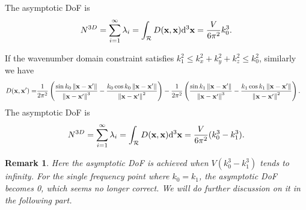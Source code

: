 \documentclass[12pt,draftclsnofoot,journal,onecolumn]{IEEEtran}
\newtheorem{remark}{Remark}
\begin{document}
	The asymptotic DoF is 
	\begin{equation}
		\begin{aligned}
			N^{3D} = \sum_{i=1}^\infty \lambda_i = \int_{\mathcal{R}}D({\bf x},{\bf x}){\rm d}^3{\bf x} = \frac{V}{6\pi^2}k_0^3.
		\end{aligned}
	\end{equation}
	
	If the wavenumber domain constraint satisfies $k_1^2\leqslant k_x^2+k_y^2+k_z^2 \leqslant k_0^2$, similarly we have
	\begin{equation}
		\begin{aligned}
			D({\bf x},{\bf x}') =& \frac{1}{2\pi^2} \left( \frac{\sin k_0\left\| {\bf x}-{\bf x}' \right\|}{\left\| {\bf x}-{\bf x}' \right\|^3}-\frac{k_0\cos k_0\left\| {\bf x}-{\bf x}' \right\|}{\left\| {\bf x}-{\bf x}' \right\|^2} \right)
	-\frac{1}{2\pi^2} \left( \frac{\sin k_1\left\| {\bf x}-{\bf x}' \right\|}{\left\| {\bf x}-{\bf x}' \right\|^3}-\frac{k_1\cos k_1\left\| {\bf x}-{\bf x}' \right\|}{\left\| {\bf x}-{\bf x}' \right\|^2} \right).
		\end{aligned}
		\label{equ_spherical_shell}
	\end{equation}
	The asymptotic DoF is 
	\begin{equation}
	\begin{aligned}
		N^{3D} = \sum_{i=1}^\infty \lambda_i = \int_{\mathcal{R}}D({\bf x},{\bf x}){\rm d}^3{\bf x} = \frac{V}{6\pi^2}(k_0^3-k_1^3).
	\end{aligned}
	\end{equation}
	\begin{remark}
		Here the asymptotic DoF is achieved when $V(k_0^3-k_1^3)$ tends to infinity. For the single frequency point where $k_0=k_1$, the asymptotic DoF becomes 0, which seems no longer correct. We will do further discussion on it in the following part. 
		\end{remark}
	
\end{document}

